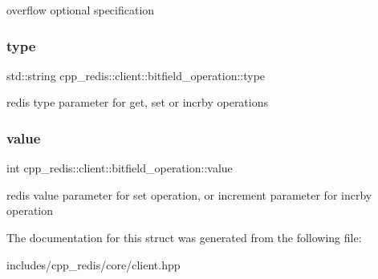 overflow optional specification \mbox{\label{structcpp__redis_1_1client_1_1bitfield__operation_adbbf30e5138d0524940d536b2bc71480}} 
\subsubsection{\texorpdfstring{type}{type}}
{\footnotesize\ttfamily std\+::string cpp\+\_\+redis\+::client\+::bitfield\+\_\+operation\+::type}

redis type parameter for get, set or incrby operations \mbox{\label{structcpp__redis_1_1client_1_1bitfield__operation_a8104441f6b9ee7cbf5e6ee6c17c7445c}} 
\subsubsection{\texorpdfstring{value}{value}}
{\footnotesize\ttfamily int cpp\+\_\+redis\+::client\+::bitfield\+\_\+operation\+::value}

redis value parameter for set operation, or increment parameter for incrby operation 

The documentation for this struct was generated from the following file\+:\begin{DoxyCompactItemize}
\item 
includes/cpp\+\_\+redis/core/client.\+hpp\end{DoxyCompactItemize}
